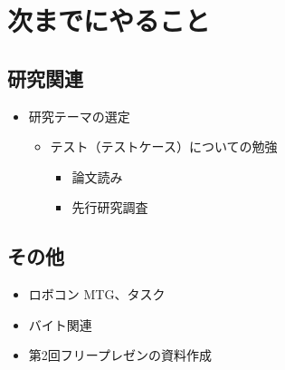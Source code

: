 \documentclass[uplatex, onecolumn, 10pt]{jsarticle}
\begin{document}
\section{次までにやること}

\subsection*{研究関連}
\begin{itemize}
	\item 研究テーマの選定
	\begin{itemize}
        \item テスト（テストケース）についての勉強
        \begin{itemize}
            \item 論文読み
            \item 先行研究調査
        \end{itemize}
    \end{itemize}
\end{itemize}

\subsection*{その他}
\begin{itemize}
    \item ロボコン MTG、タスク
    \item バイト関連
    \item 第2回フリープレゼンの資料作成
\end{itemize}
\end{document}
